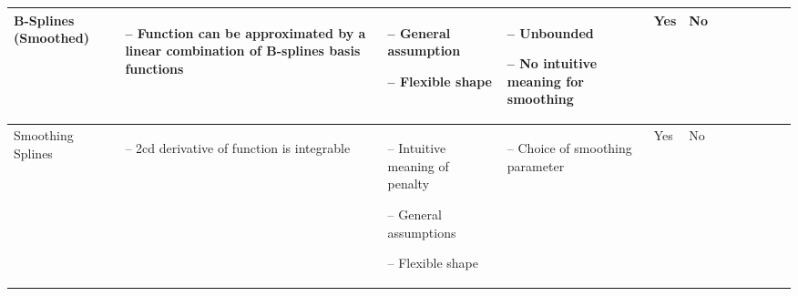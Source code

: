 \begin{table}[!ht]
\begin{tabular}{p{1.6cm}p{3.3cm}p{3.3cm}p{3.4cm}p{0.4cm}p{0.4cm}p{3cm}p{3cm}p{3cm}p{3cm}p{2.7cm}p{3cm}|}
		B-Splines (Smoothed)                                                                                                                                         &
		\begin{cptitemize} \item[--]  Function can be approximated by a linear combination of B-splines basis functions               \end{cptitemize}               &
		\begin{cptitemize} \item[--]  General assumption \item[--]  Flexible shape                                                            \end{cptitemize}        &
		\begin{cptitemize} \item[--]  Unbounded \item[--]  No intuitive meaning for smoothing                                                \end{cptitemize}        &
		Yes                                                                                                                                                            &
		No                                            \\ \hline%

		Smoothing Splines                                                                                                                                            &
		\begin{cptitemize} \item[--]  2cd derivative of function is integrable                                                        \end{cptitemize}               &
		\begin{cptitemize} \item[--]  Intuitive meaning of penalty \item[--]  General assumptions \item[--]  Flexible shape                         \end{cptitemize} &
		\begin{cptitemize} \item[--]  Choice of smoothing parameter                                                                                       \end{cptitemize}               &
		Yes                                                                                                                                                          &
        No \\                                                                         


\end{tabular}
\end{table}
